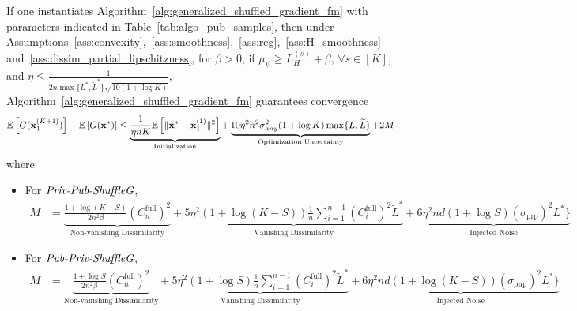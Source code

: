 \begin{corollary}
\label{corollary:convergence_pub_data_opt}
    If one instantiates Algorithm~\ref{alg:generalized_shuffled_gradient_fm} with parameters indicated in Table~\ref{tab:algo_pub_samples}, then
    under Assumptions~\ref{ass:convexity},~\ref{ass:smoothness},~\ref{ass:reg},~\ref{ass:H_smoothness} and~\ref{ass:dissim_partial_lipschitzness}, 
    for $\beta > 0$, 
    if $\mu_{\psi} \geq L_H^{(s)} + \beta$, $\forall s\in [K]$, and 
     $\eta \leq \frac{1}{2n \max\{L^*, \widetilde{L}^{*}\} \sqrt{10 (1+\log K)}}$,     Algorithm~\ref{alg:generalized_shuffled_gradient_fm}
    guarantees convergence 
    \begin{align}
        &\mathbb{E}\left[ G({\mathbf{x}}_1^{(K+1)}) \right] - \mathbb{E}\left[G({\mathbf{x}}^*)\right]
        \leq \underbrace{ \frac{1}{\eta n K}\mathbb{E}\left[\|{\mathbf{x}}^* - {\mathbf{x}}_1^{(1)}\|^2 \right] }_{\text{Initialization}}
        + \underbrace{ 10 \eta^2 n^2 \sigma_{any}^2 (1+\log K)\max\{L, \widetilde{L}\} }_{\text{Optimization Uncertainty}} + 2 M
    \end{align}
    where
    \begin{itemize}[itemsep=0mm]
        \item For \textbf{$\textit{Priv-Pub-ShuffleG}$},
            \begin{align*}
                M &= \underbrace{
                    \frac{1 + \log (K-S)}{2 n^2 \beta} (C_n^{\text{full}})^2
                }_{\text{Non-vanishing Dissimilarity}}
                + \underbrace{
                    5\eta^2 (1+ \log (K - S)) \frac{1}{n}\sum_{i=1}^{n-1}(C_i^{\text{full}})^2\widetilde{L}^{*}
                }_{\text{Vanishing Dissimilarity}}
                + \underbrace{
                    6 \eta^2 nd (1 + \log S) (\sigma_{\text{prp}})^2 L^{*}\}
                }_{\text{Injected Noise}}
            \end{align*}

        \item For \textbf{$\textit{Pub-Priv-ShuffleG}$},
            \begin{align*}
                M &= \underbrace{
                    \frac{1 + \log S}{2n^2 \beta} (C_n^{\text{full}})^2
                }_{\text{Non-vanishing Dissimilarity}}
                + \underbrace{
                    5 \eta^2 (1+\log S) \frac{1}{n}\sum_{i=1}^{n-1} (C_i^{\text{full}})^2 \widetilde{L}^{*}
                }_{\text{Vanishing Dissimilarity}}
                + \underbrace{
                    6 \eta^2 nd (1 + \log (K-S)) (\sigma_{\text{pup}})^2 L^{*}\}
                }_{\text{Injected Noise}}
            \end{align*}


\end{itemize}
\end{corollary}

